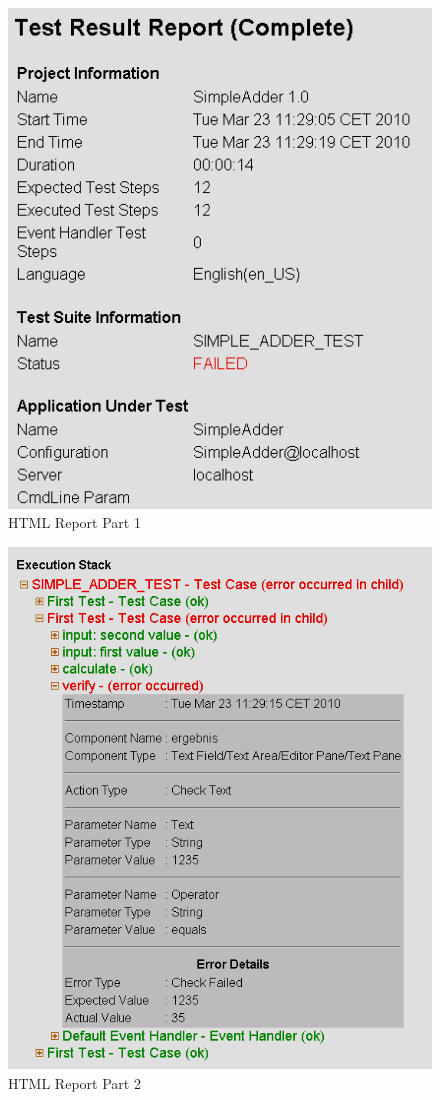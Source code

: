\begin{figure}
\includegraphics{Tasks/Testexecution/PS/htmlpart1}
\caption{HTML Report Part 1}
\label{htmlreport1}
\end{figure}
\begin{figure}
\includegraphics{Tasks/Testexecution/PS/htmlpart2}
\caption{HTML Report Part 2}
\label{htmlreport2}
\end{figure}

